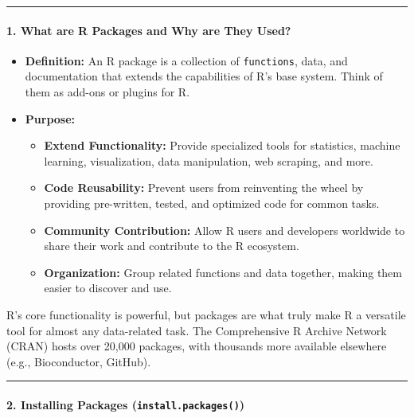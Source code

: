 \documentclass[
]{article}
\providecommand{\tightlist}{%
  \setlength{\itemsep}{0pt}\setlength{\parskip}{0pt}}
\begin{document}
\begin{center}\rule{0.5\linewidth}{0.5pt}\end{center}

\paragraph{\texorpdfstring{\textbf{1. What are R Packages and Why are
They
Used?}}{1. What are R Packages and Why are They Used?}}\label{what-are-r-packages-and-why-are-they-used}

\begin{itemize}
\tightlist
\item
  \textbf{Definition:} An R package is a collection of
  \texttt{functions}, data, and documentation that extends the
  capabilities of R's base system. Think of them as add-ons or plugins
  for R.
\item
  \textbf{Purpose:}

  \begin{itemize}
  \tightlist
  \item
    \textbf{Extend Functionality:} Provide specialized tools for
    statistics, machine learning, visualization, data manipulation, web
    scraping, and more.
  \item
    \textbf{Code Reusability:} Prevent users from reinventing the wheel
    by providing pre-written, tested, and optimized code for common
    tasks.
  \item
    \textbf{Community Contribution:} Allow R users and developers
    worldwide to share their work and contribute to the R ecosystem.
  \item
    \textbf{Organization:} Group related functions and data together,
    making them easier to discover and use.
  \end{itemize}
\end{itemize}

R's core functionality is powerful, but packages are what truly make R a
versatile tool for almost any data-related task. The Comprehensive R
Archive Network (CRAN) hosts over 20,000 packages, with thousands more
available elsewhere (e.g., Bioconductor, GitHub).

\begin{center}\rule{0.5\linewidth}{0.5pt}\end{center}

\paragraph{\texorpdfstring{\textbf{2. Installing Packages
(\texttt{install.packages()})}}{2. Installing Packages (install.packages())}}\label{installing-packages-install.packages}
\end{document}
